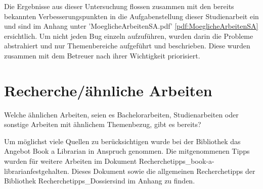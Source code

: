 Die Ergebnisse aus dieser Untersuchung flossen zusammen mit den bereits bekannten Verbesserungspunkten  in die Aufgabenstellung dieser Studienarbeit ein und sind im Anhang unter 'MoeglicheArbeitenSA.pdf' \ref{pdf:MoeglicheArbeitenSA}  ersichtlich. Um nicht jeden Bug einzeln aufzuführen, wurden darin die Probleme abstrahiert und nur Themenbereiche aufgeführt und beschrieben. Diese wurden zusammen mit dem Betreuer nach ihrer Wichtigkeit priorisiert.

\newpage

\section{Recherche/ähnliche Arbeiten}
\label{sec:rechercheAehnlicheArbeiten}

Welche ähnlichen Arbeiten, seien es Bachelorarbeiten, Studienarbeiten oder sonstige Arbeiten mit ähnlichem Themenbezug, gibt es bereits?

Um möglichst viele Quellen zu berücksichtigen wurde bei der Bibliothek das Angebot \glqq Book a Librarian\grqq \cite{hsr_book_a_librarian} in Anspruch genommen. Die mitgenommenen Tipps wurden für weitere Arbeiten im Dokument \glqq Recherchetipps\_book-a-librarian\grqq festgehalten. Dieses Dokument sowie die allgemeinen Recherchetipps der Bibliothek \glqq Recherchetipps\_Dossier\grqq sind im Anhang zu finden. 

